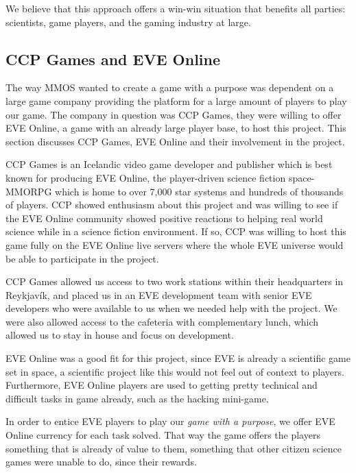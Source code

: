 	We believe that this approach offers a win-win situation that benefits all parties: scientists, game players, and the gaming industry at large. 


\subsection{CCP Games and EVE Online}
	The way MMOS wanted to create a game with a purpose was dependent on a large game company providing the platform for a large amount of players to play our game. The company in question was CCP Games, they were willing to offer EVE Online, a game with an already large player base, to host this project. This section discusses CCP Games, EVE Online and their involvement in the project.

	CCP Games is an Icelandic video game developer and publisher which is best known for producing EVE Online, the player-driven science fiction space-MMORPG which is home to over 7,000 star systems and hundreds of thousands of players. CCP showed enthusiasm about this project and was willing to see if the EVE Online community showed positive reactions to helping real world science while in a science fiction environment. If so, CCP was willing to host this game fully on the EVE Online live servers where the whole EVE universe would be able to participate in the project.

	CCP Games allowed us access to two work stations within their headquarters in Reykjavík, and placed us in an EVE development team with senior EVE developers who were available to us when we needed help with the project. We were also allowed access to the cafeteria with complementary lunch, which allowed us to stay in house and focus on development.

	EVE Online was a good fit for this project, since EVE is already a scientific game set in space, a scientific project like this would not feel out of context to players. Furthermore, EVE Online players are used to getting pretty technical and difficult tasks in game already, such as the hacking mini-game.

	In order to entice EVE players to play our \emph{game with a purpose}, we offer EVE Online currency for each task solved. That way the game offers the players something that is already of value to them, something that other citizen science games were unable to do, since their rewards.


